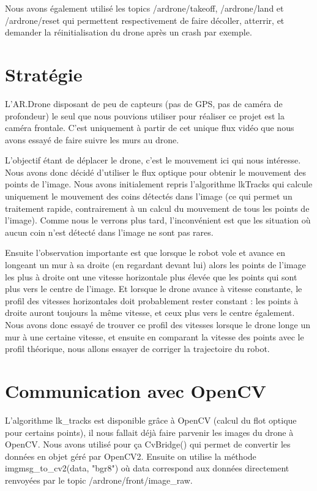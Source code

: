 \documentclass[titlepage,11pt,a4paper]{article}
\begin{document}
Nous avons également utilisé les topics /ardrone/takeoff, /ardrone/land et /ardrone/reset qui permettent respectivement de faire décoller, atterrir, et demander la réinitialisation du drone après un crash par exemple.

\section{Stratégie}
L'AR.Drone disposant de peu de capteurs (pas de GPS, pas de caméra de profondeur) le seul que nous pouvions utiliser pour réaliser ce projet est la caméra frontale. C'est uniquement à partir de cet unique flux vidéo que nous avons essayé de faire suivre les murs au drone.

L'objectif étant de déplacer le drone, c'est le mouvement ici qui nous intéresse. Nous avons donc décidé d'utiliser le flux optique pour obtenir le mouvement des points de l'image. Nous avons initialement repris l'algorithme lkTracks qui calcule uniquement le mouvement des coins détectés dans l'image (ce qui permet un traitement rapide, contrairement à un calcul du mouvement de tous les points de l'image). Comme nous le verrons plus tard, l'inconvénient est que les situation où aucun coin n'est détecté dans l'image ne sont pas rares.

Ensuite l'observation importante est que lorsque le robot vole et avance en longeant un mur à sa droite (en regardant devant lui) alors les points de l'image les plus à droite ont une vitesse horizontale plus élevée que les points qui sont plus vers le centre de l'image. Et lorsque le drone avance à vitesse constante, le profil des vitesses horizontales doit probablement rester constant : les points à droite auront toujours la même vitesse, et ceux plus vers le centre également. Nous avons donc essayé de trouver ce profil des vitesses lorsque le drone longe un mur à une certaine vitesse, et ensuite en comparant la vitesse des points avec le profil théorique, nous allons essayer de corriger la trajectoire du robot.

\section{Communication avec OpenCV}
L'algorithme lk\_tracks est disponible grâce à OpenCV (calcul du flot optique pour certains points), il nous fallait déjà faire parvenir les images du drone à OpenCV. Nous avons utilisé pour ça CvBridge() qui permet de convertir les données en objet géré par OpenCV2. Ensuite on utilise la méthode imgmsg\_to\_cv2(data, "bgr8") où data correspond aux données directement renvoyées par le topic /ardrone/front/image\_raw.
\end{document}
